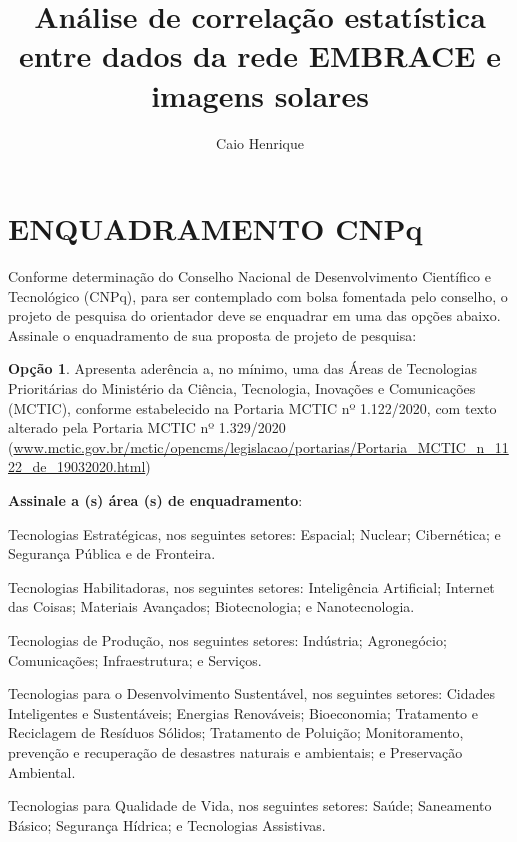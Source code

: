 \documentclass[12pt, 2024, professor]{uftpibic}
\title{Análise de correlação estatística entre dados da rede EMBRACE e imagens solares}
\author{Caio Henrique}{Machado}
\newcommand{\ok}{\makebox[0pt][l]{(\ \ \ )}\raisebox{.15ex}{\hspace{0.1em}\color{blue}{ $\checkmark\quad$}}}
\newcommand{\ko}{\makebox[0pt][l]{(\ \ \ )}\raisebox{.15ex}{\hspace{0.1em}$\qquad$}}
\theoremstyle{plain}
\begin{document}
\maketitle

\vspace{1cm}
\chapter{ENQUADRAMENTO CNP\lowercase{q}}

\onehalfspace
Conforme determinação do Conselho Nacional de Desenvolvimento Científico e Tecnológico (CNPq), para ser contemplado com bolsa fomentada pelo conselho, o projeto de pesquisa do orientador deve se enquadrar em uma das opções abaixo. Assinale o enquadramento de sua proposta de projeto de pesquisa:

\bigbreak

\ok \textbf{Opção 1}. Apresenta aderência a, no mínimo, uma das Áreas de Tecnologias Prioritárias do Ministério da Ciência, Tecnologia, Inovações e Comunicações (MCTIC), conforme estabelecido na Portaria MCTIC nº 1.122/2020, com texto alterado pela Portaria MCTIC nº 1.329/2020 (\url{www.mctic.gov.br/mctic/opencms/legislacao/portarias/Portaria_MCTIC_n_1122_de_19032020.html})

\bigbreak

\textbf{Assinale a (s) área (s) de enquadramento}:

\bigbreak

\ok  Tecnologias Estratégicas, nos seguintes setores: Espacial; Nuclear; Cibernética; e Segurança Pública e de Fronteira.

\ok Tecnologias Habilitadoras, nos seguintes setores: Inteligência Artificial; Internet das Coisas; Materiais Avançados; Biotecnologia; e Nanotecnologia.

\ko Tecnologias de Produção, nos seguintes setores: Indústria; Agronegócio; Comunicações; Infraestrutura; e Serviços.

\ko Tecnologias para o Desenvolvimento Sustentável, nos seguintes setores: Cidades Inteligentes e Sustentáveis; Energias Renováveis; Bioeconomia; Tratamento e Reciclagem de Resíduos Sólidos; Tratamento de Poluição; Monitoramento, prevenção e recuperação de desastres naturais e ambientais; e Preservação Ambiental.

\ko Tecnologias para Qualidade de Vida, nos seguintes setores: Saúde; Saneamento Básico; Segurança Hídrica; e Tecnologias Assistivas.

\bigbreak
\end{document}
